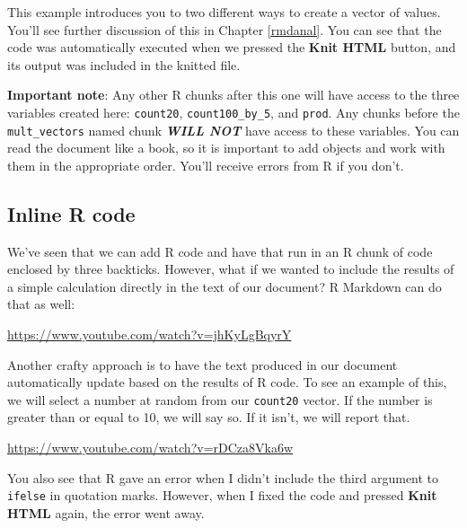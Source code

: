 \documentclass[]{tufte-book}
\begin{document}
This example introduces you to two different ways to create a vector of values. You'll see further discussion of this in Chapter \ref{rmdanal}. You can see that the code was automatically executed when we pressed the \textbf{Knit HTML} button, and its output was included in the knitted file.

\textbf{Important note}: Any other R chunks after this one will have access to the three variables created here: \texttt{count20}, \texttt{count100\_by\_5}, and \texttt{prod}. Any chunks before the \texttt{mult\_vectors} named chunk \textbf{\emph{WILL NOT}} have access to these variables. You can read the document like a book, so it is important to add objects and work with them in the appropriate order. You'll receive errors from R if you don't.

\hypertarget{inline-r-code}{%
\subsection{Inline R code}\label{inline-r-code}}

We've seen that we can add R code and have that run in an R chunk of code enclosed by three backticks. However, what if we wanted to include the results of a simple calculation directly in the text of our document? R Markdown can do that as well:

\vspace{0.1in}\begin{center}\footnotesize{\url{https://www.youtube.com/watch?v=jhKyLgBqyrY}}\end{center}\vspace{0.1in}

Another crafty approach is to have the text produced in our document automatically update based on the results of R code. To see an example of this, we will select a number at random from our \texttt{count20} vector. If the number is greater than or equal to 10, we will say so. If it isn't, we will report that.

\vspace{0.1in}\begin{center}\footnotesize{\url{https://www.youtube.com/watch?v=rDCza8Vka6w}}\end{center}\vspace{0.1in}

You also see that R gave an error when I didn't include the third argument to \texttt{ifelse} in quotation marks. However, when I fixed the code and pressed \textbf{Knit HTML} again, the error went away.
\end{document}
